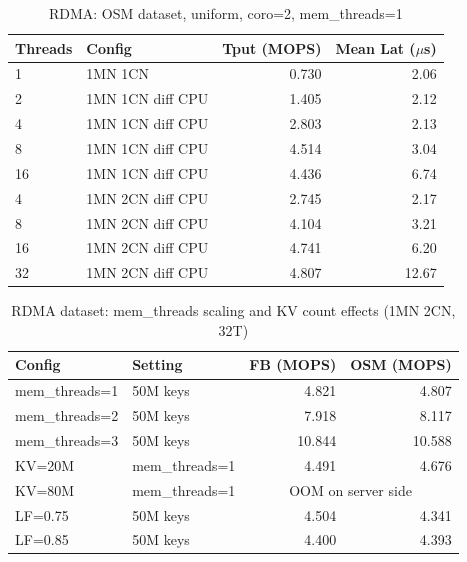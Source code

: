 \documentclass[conference]{IEEEtran}
\begin{document}
\begin{table}[H]
\centering
\caption{RDMA: OSM dataset, uniform, coro=2, mem\_threads=1}
\label{tab:rdma-osm}
\scriptsize
\begin{tabular}{@{}llrr@{}}
\toprule
\textbf{Threads} & \textbf{Config} & \textbf{Tput (MOPS)} & \textbf{Mean Lat ($\mu$s)} \\
\midrule
1  & 1MN 1CN             & 0.730 & 2.06 \\
2  & 1MN 1CN diff CPU    & 1.405 & 2.12 \\
4  & 1MN 1CN diff CPU    & 2.803 & 2.13 \\
8  & 1MN 1CN diff CPU    & 4.514 & 3.04 \\
16 & 1MN 1CN diff CPU    & 4.436 & 6.74 \\
\midrule
4  & 1MN 2CN diff CPU    & 2.745 & 2.17 \\
8  & 1MN 2CN diff CPU    & 4.104 & 3.21 \\
16 & 1MN 2CN diff CPU    & 4.741 & 6.20 \\
32 & 1MN 2CN diff CPU    & 4.807 & 12.67 \\
\bottomrule
\end{tabular}
\end{table}

\begin{table}[H]
\centering
\caption{RDMA dataset: mem\_threads scaling and KV count effects (1MN 2CN, 32T)}
\label{tab:rdma-dataset-extra}
\scriptsize
\begin{tabular}{@{}llrr@{}}
\toprule
\textbf{Config} & \textbf{Setting} & \textbf{FB (MOPS)} & \textbf{OSM (MOPS)} \\
\midrule
mem\_threads=1  & 50M keys & 4.821 & 4.807 \\
mem\_threads=2  & 50M keys & 7.918 & 8.117 \\
mem\_threads=3  & 50M keys & 10.844 & 10.588 \\
\midrule
KV=20M & mem\_threads=1  & 4.491 & 4.676 \\
KV=80M & mem\_threads=1  & \multicolumn{2}{c}{OOM on server side} \\
\midrule
LF=0.75 & 50M keys & 4.504 & 4.341 \\
LF=0.85 & 50M keys & 4.400 & 4.393 \\
\bottomrule
\end{tabular}
\end{table}
\end{document}

